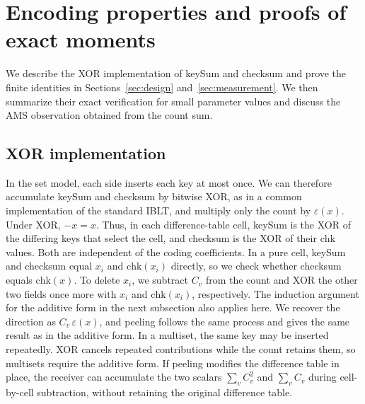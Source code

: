 \section{Encoding properties and proofs of exact moments}\label{app:encoding}
We describe the XOR implementation of keySum and checksum and prove the finite identities in Sections~\ref{sec:design} and~\ref{sec:measurement}. We then summarize their exact verification for small parameter values and discuss the AMS observation obtained from the count sum.

\subsection{XOR implementation}\label{app:xor}
In the set model, each side inserts each key at most once. We can therefore accumulate keySum and checksum by bitwise XOR, as in a common implementation of the standard IBLT, and multiply only the count by $\varepsilon(x)$. Under XOR, $-x=x$. Thus, in each difference-table cell, keySum is the XOR of the differing keys that select the cell, and checksum is the XOR of their $\mathrm{chk}$ values. Both are independent of the coding coefficients. In a pure cell, keySum and checksum equal $x_i$ and $\mathrm{chk}(x_i)$ directly, so we check whether checksum equals $\mathrm{chk}(x)$. To delete $x_i$, we subtract $C_v$ from the count and XOR the other two fields once more with $x_i$ and $\mathrm{chk}(x_i)$, respectively. The induction argument for the additive form in the next subsection also applies here. We recover the direction as $C_v\,\varepsilon(x)$, and peeling follows the same process and gives the same result as in the additive form. In a multiset, the same key may be inserted repeatedly. XOR cancels repeated contributions while the count retains them, so multisets require the additive form. If peeling modifies the difference table in place, the receiver can accumulate the two scalars $\sum_vC_v^2$ and $\sum_vC_v$ during cell-by-cell subtraction, without retaining the original difference table.


